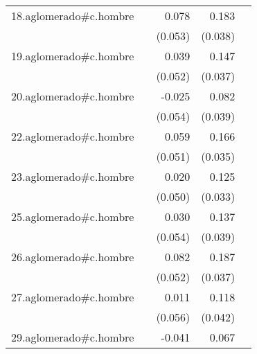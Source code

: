 {\begin{longtable}{l*{4}{D{.}{.}{-1}}}
\addlinespace
18.aglomerado#c.hombre&                     &       0.078         &       0.183\sym{***}&                     \\
            &                     &     (0.053)         &     (0.038)         &                     \\
\addlinespace
19.aglomerado#c.hombre&                     &       0.039         &       0.147\sym{***}&                     \\
            &                     &     (0.052)         &     (0.037)         &                     \\
\addlinespace
20.aglomerado#c.hombre&                     &      -0.025         &       0.082\sym{*}  &                     \\
            &                     &     (0.054)         &     (0.039)         &                     \\
\addlinespace
22.aglomerado#c.hombre&                     &       0.059         &       0.166\sym{***}&                     \\
            &                     &     (0.051)         &     (0.035)         &                     \\
\addlinespace
23.aglomerado#c.hombre&                     &       0.020         &       0.125\sym{***}&                     \\
            &                     &     (0.050)         &     (0.033)         &                     \\
\addlinespace
25.aglomerado#c.hombre&                     &       0.030         &       0.137\sym{***}&                     \\
            &                     &     (0.054)         &     (0.039)         &                     \\
\addlinespace
26.aglomerado#c.hombre&                     &       0.082         &       0.187\sym{***}&                     \\
            &                     &     (0.052)         &     (0.037)         &                     \\
\addlinespace
27.aglomerado#c.hombre&                     &       0.011         &       0.118\sym{**} &                     \\
            &                     &     (0.056)         &     (0.042)         &                     \\
\addlinespace
29.aglomerado#c.hombre&                     &      -0.041         &       0.067\sym{*}  &                     \\

\end{longtable}}
